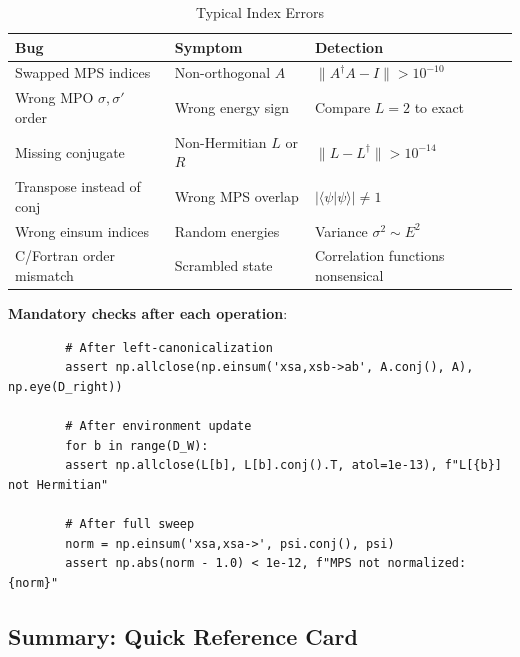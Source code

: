 \documentclass[aps,prb,onecolumn,scriptaddress]{revtex4-2}
\newcommand{\braket}[2]{\langle#1|#2\rangle}
\begin{document}
	\begin{table}[h]
		\centering
		\caption{Typical Index Errors}
		\begin{tabular}{@{}lll@{}}
			\toprule
			\textbf{Bug} & \textbf{Symptom} & \textbf{Detection} \\
			\midrule
			Swapped MPS indices & Non-orthogonal $A$ & $\|A^\dagger A - I\| > 10^{-10}$ \\
			Wrong MPO $\sigma, \sigma'$ order & Wrong energy sign & Compare $L=2$ to exact \\
			Missing conjugate & Non-Hermitian $L$ or $R$ & $\|L - L^\dagger\| > 10^{-14}$ \\
			Transpose instead of conj & Wrong MPS overlap & $|\braket{\psi}{\psi}| \neq 1$ \\
			Wrong einsum indices & Random energies & Variance $\sigma^2 \sim E^2$ \\
			C/Fortran order mismatch & Scrambled state & Correlation functions nonsensical \\
			\bottomrule
		\end{tabular}
	\end{table}
	
	\textbf{Mandatory checks after each operation}:
	\begin{verbatim}
		# After left-canonicalization
		assert np.allclose(np.einsum('xsa,xsb->ab', A.conj(), A), np.eye(D_right))
		
		# After environment update
		for b in range(D_W):
		assert np.allclose(L[b], L[b].conj().T, atol=1e-13), f"L[{b}] not Hermitian"
		
		# After full sweep
		norm = np.einsum('xsa,xsa->', psi.conj(), psi)
		assert np.abs(norm - 1.0) < 1e-12, f"MPS not normalized: {norm}"
	\end{verbatim}
	
	\subsection{Summary: Quick Reference Card}
	
\end{document}

